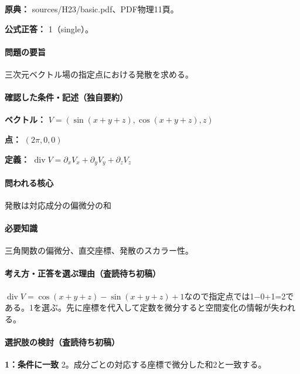 \noindent\textbf{原典：} sources/H23/basic.pdf、PDF物理11頁。

\textbf{公式正答：} 1（single）。

\paragraph{問題の要旨} 三次元ベクトル場の指定点における発散を求める。

\paragraph{確認した条件・記述（独自要約）}\mbox{}\par

\noindent\textbf{ベクトル：} \(V=(\sin(x+y+z),\cos(x+y+z),z)\)\par

\noindent\textbf{点：} \((2\pi,0,0)\)\par

\noindent\textbf{定義：} \(\operatorname{div}V=\partial_xV_x+\partial_yV_y+\partial_zV_z\)\par

\paragraph{問われる核心} 発散は対応成分の偏微分の和

\paragraph{必要知識} 三角関数の偏微分、直交座標、発散のスカラー性。

\paragraph{考え方・正答を選ぶ理由（査読待ち初稿）} \(\operatorname{div}V=\cos(x+y+z)-\sin(x+y+z)+1\)なので指定点では1−0+1=\allowbreak{}2である。1を選ぶ。先に座標を代入して定数を微分すると空間変化の情報が失われる。

\paragraph{選択肢の検討（査読待ち初稿）}\mbox{}\par

\noindent\textbf{1：条件に一致} 2。成分ごとの対応する座標で微分した和2と一致する。\par

